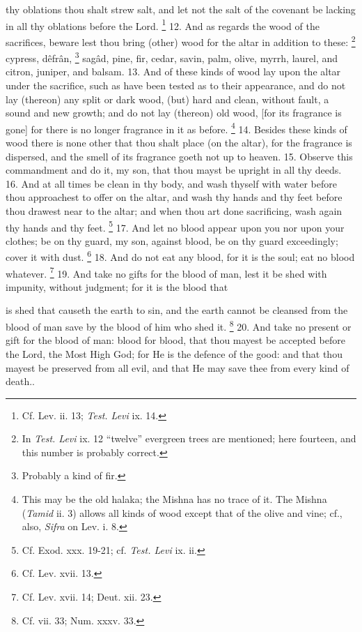 thy oblations thou shalt strew salt, and let not the salt of the covenant be lacking in all thy oblations before the Lord. \footnote{Cf. Lev. ii. 13; \emph{Test. Levi} ix. 14.} 12. And as regards the wood of the sacrifices, beware lest thou bring (other) wood for the altar in addition to these: \footnote{In \emph{Test. Levi} ix. 12 ``twelve'' evergreen trees are mentioned; here fourteen, and this number is probably correct.} cypress, dêfrân, \footnote{Probably a kind of fir.} sagâd, pine, fir, cedar, savin, palm, olive, myrrh, laurel, and citron, juniper, and balsam. 13. And of these kinds of wood lay upon the altar under the sacrifice, such as have been tested as to their appearance, and do not lay (thereon) any split or dark wood, (but) hard and clean, without fault, a sound and new growth; and do not lay (thereon) old wood, [for its fragrance is gone] for there is no longer fragrance in it as before. \footnote{This may be the old halaka; the Mishna has no trace of it. The Mishna (\emph{Tamid} ii. 3) allows all kinds of wood except that of the olive and vine; cf., also, \emph{Sifra} on Lev. i. 8.} 14. Besides these kinds of wood there is none other that thou shalt place (on the altar), for the fragrance is dispersed, and the smell of its fragrance goeth not up to heaven. 15. Observe this commandment and do it, my son, that thou mayst be upright in all thy deeds. 16. And at all times be clean in thy body, and wash thyself with water before thou approachest to offer on the altar, and wash thy hands and thy feet before thou drawest near to the altar; and when thou art done sacrificing, wash again thy hands and thy feet. \footnote{Cf. Exod. xxx. 19-21; cf. \emph{Test. Levi} ix. ii.} 17. And let no blood appear upon you nor upon your clothes; be on thy guard, my son, against blood, be on thy guard exceedingly; cover it with dust. \footnote{Cf. Lev. xvii. 13.} 18. And do not eat any blood, for it is the soul; eat no blood whatever. \footnote{Cf. Lev. xvii. 14; Deut. xii. 23.} 19. And take no gifts for the blood of man, lest it be shed with impunity, without judgment; for it is the blood that

is shed that causeth the earth to sin, and the earth cannot be cleansed from the blood of man save by the blood of him who shed it. \footnote{Cf. vii. 33; Num. xxxv. 33.} 20. And take no present or gift for the blood of man: blood for blood, that thou mayest be accepted before the Lord, the Most High God; for He is the defence of the good: and that thou mayest be preserved from all evil, and that He may save thee from every kind of death..

